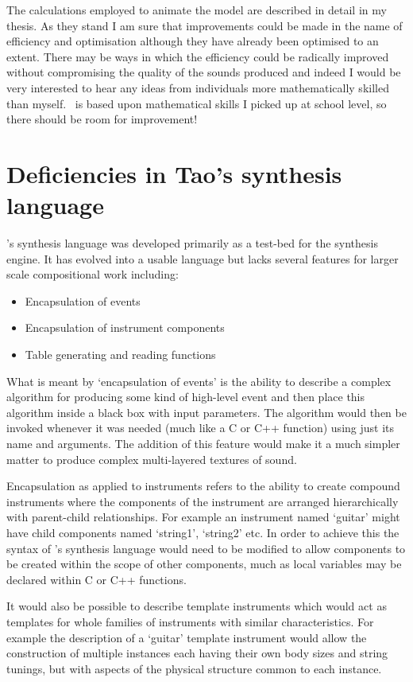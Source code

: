 The calculations employed to animate the model are described in detail in
my thesis. As they stand I am sure that improvements could be made in the
name of efficiency and optimisation although they have already been optimised
to an extent. There may be ways in which the efficiency could be radically
improved without compromising the quality of the sounds produced and indeed
I would be very interested to hear any ideas from individuals more mathematically
skilled than myself. \tao\ is based upon mathematical skills I picked up at
school level, so there should be room for improvement!

\section{Deficiencies in Tao's synthesis language}
\label{section:script_deficiencies}
\tao's synthesis language was developed primarily as a test-bed for the synthesis
engine. It has evolved into a usable language but lacks several features for
larger scale compositional work including:
\begin{itemize}
\item
Encapsulation of events
\item
Encapsulation of instrument components
\item
Table generating and reading functions
\end{itemize}

What is meant by `encapsulation of events' is the ability to describe a
complex algorithm for producing some kind of high-level event and then
place this algorithm inside a black box with input parameters. The
algorithm would then be invoked whenever it was needed
(much like a C or C++ function) using just its name and arguments.
The addition of this feature would make it a much simpler matter to
produce complex multi-layered textures of sound.

Encapsulation as applied to instruments refers to the ability to create
compound instruments where the components of the instrument are arranged
hierarchically with parent-child relationships. For example an instrument
named `guitar' might have child components named `string1', `string2'
etc. In order to achieve this the syntax of \tao's synthesis language
would need to be modified to allow components to be created within the
scope of other components, much as local variables may be declared
within C or C++ functions.

It would also be possible to describe template instruments which would
act as templates for whole families of instruments with similar
characteristics. For example the description of a `guitar' template
instrument would allow the construction of multiple instances each
having their own body sizes and string tunings, but with aspects of
the physical structure common to each instance.

